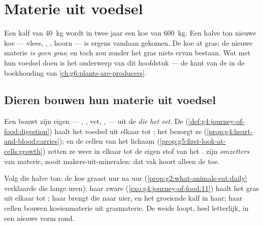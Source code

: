 \chapter{Materie uit voedsel}\label{ch:g6:matter-from-food}

Een kalf van \qty{40}{kg} wordt in twee jaar een koe van \qty{600}{kg}.
Een halve ton nieuwe koe --- vlees, , , hoorn --- is ergens
vandaan gekomen. De koe at gras; de nieuwe materie \emph{is geen gras};
en toch zou zonder het gras niets ervan bestaan. Wat  met hun
voedsel doen is het onderwerp van dit hoofdstuk --- de kant van de
 in de boekhouding van \cref{ch:g6:plants-are-producers}.

\section{Dieren bouwen hun materie uit voedsel}

\begin{proposition}\label{prop:g6:matter-from-food:transform}
Een  bouwt zijn eigen  --- , , vet, ,
 --- uit de \emph{ die het eet}. De 
(\cref{def:g4:journey-of-food:digestion}) haalt het voedsel uit elkaar
tot ; het  bezorgt ze
(\cref{prop:g4:heart-and-blood:carries}); en de cellen van het lichaam
(\cref{prop:g5:first-look-at-cells:growth}) zetten ze weer in elkaar tot
de eigen stof van het .  zijn \emph{omzetters} van materie,
nooit makers-uit-mineralen: dat vak hoort alleen de  toe.
\end{proposition}
\admitted

\begin{example}\label{ex:g6:matter-from-food:cow}
Volg die halve ton: de koe graast uur na uur
(\cref{prop:g2:what-animals-eat:daily} verklaarde die lange uren); haar
zware  (\cref{exo:g4:journey-of-food:11}) haalt het gras uit
elkaar tot ; haar  brengt die naar uier,  en het
groeiende kalf in haar; haar cellen bouwen koeienmaterie uit
grasmaterie. De weide loopt, heel letterlijk, in een nieuwe vorm rond.
\end{example}

